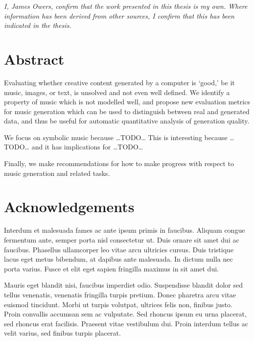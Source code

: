 \documentclass[12pt,a4paper,]{report}
\begin{document}
\noindent \textit{
I, James Owers, confirm that the work presented in this thesis is my own. Where information has been derived from other sources, I confirm that this has been indicated in the thesis.
} \vspace*{\fill}  \newpage

\hypertarget{abstract}{%
\chapter*{Abstract}\label{abstract}}

Evaluating whether creative content generated by a computer is `good,'
be it music, images, or text, is unsolved and not even well defined. We
identify a property of music which is not modelled well, and propose new
evaluation metrics for music generation which can be used to distinguish
between real and generated data, and thus be useful for automatic
quantitative analysis of generation quality.

We focus on symbolic music because \ldots TODO\ldots{} This is
interesting because \ldots TODO\ldots{} and it has implications for
\ldots TODO\ldots{}

Finally, we make recommendations for how to make progress with respect
to music generation and related tasks.

\setcounter{page}{1}

\hypertarget{acknowledgements}{%
\chapter*{Acknowledgements}\label{acknowledgements}}

Interdum et malesuada fames ac ante ipsum primis in faucibus. Aliquam
congue fermentum ante, semper porta nisl consectetur ut. Duis ornare sit
amet dui ac faucibus. Phasellus ullamcorper leo vitae arcu ultricies
cursus. Duis tristique lacus eget metus bibendum, at dapibus ante
malesuada. In dictum nulla nec porta varius. Fusce et elit eget sapien
fringilla maximus in sit amet dui.

Mauris eget blandit nisi, faucibus imperdiet odio. Suspendisse blandit
dolor sed tellus venenatis, venenatis fringilla turpis pretium. Donec
pharetra arcu vitae euismod tincidunt. Morbi ut turpis volutpat,
ultrices felis non, finibus justo. Proin convallis accumsan sem ac
vulputate. Sed rhoncus ipsum eu urna placerat, sed rhoncus erat
facilisis. Praesent vitae vestibulum dui. Proin interdum tellus ac velit
varius, sed finibus turpis placerat.
\end{document}
